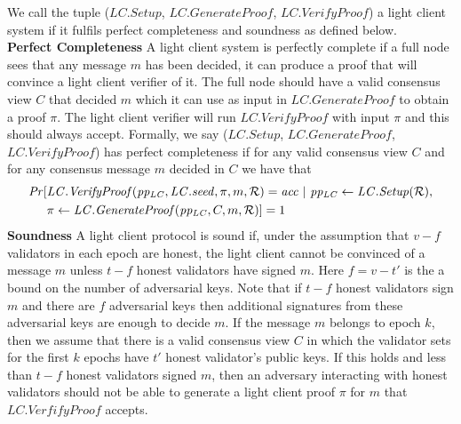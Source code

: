 \begin{definition}
\noindent We call the tuple ($\mathit{LC.Setup}$, $\mathit{LC.GenerateProof}$, 
$\mathit{LC.VerifyProof}$) a light client system if it fulfils 
perfect completeness and soundness as defined below. \\
\noindent \textbf{Perfect Completeness} A light client system is perfectly complete if a full node sees that any message $m$ has been decided, it can produce a proof that will convince a light client verifier of it. 
The full node should have a valid consensus view $C$ that decided $m$ which it can use as input in $\mathit{LC.GenerateProof}$ to obtain a proof $\pi$. The light client verifier will run 
$\mathit{LC.VerifyProof}$ with input $\pi$ and this should always accept.
Formally, we say ($\mathit{LC.Setup}$, $\mathit{LC.GenerateProof}$, $\mathit{LC.VerifyProof}$) has perfect completeness if 
for any valid consensus view $C$ and for any consensus message $m$ decided in $C$ we have that 
\begin{align*} 
\mathit{Pr} [&\mathit{LC.VerifyProof}(\mathit{pp_{\mathit{LC}}}, \LCseed, \pi, m, \mathcal{R}) = \mathit{acc} \ | \ \mathit{pp_{\mathit{LC}}} \leftarrow \mathit{LC.Setup}(\mathcal{R}),  \\
& \pi \leftarrow \mathit{LC.GenerateProof}(\mathit{pp_{\mathit{LC}}}, C, m, \mathcal{R})] = 1
\end{align*}
\noindent \textbf{Soundness} A light client protocol is sound if, under the assumption that $v-f$ validators in each epoch are honest, the light client cannot be convinced of a message $m$ unless $t-f$ honest validators have signed $m$. Here $f=v-t'$ is the a bound on the number of adversarial keys. Note that if $t-f$ honest validators sign $m$ and there are $f$ adversarial keys then additional signatures from these adversarial keys are enough to decide $m$. If the message $m$ belongs to epoch $k$, then we assume that there is a valid consensus view $C$ in which the validator sets for the first $k$ epochs have $t'$ honest validator's public keys. If this holds and less than $t-f$ honest validators signed $m$, then an adversary interacting with honest validators should not be able to generate a light client proof $\pi$ for $m$ that $LC.VerfifyProof$ accepts.


\end{definition}
